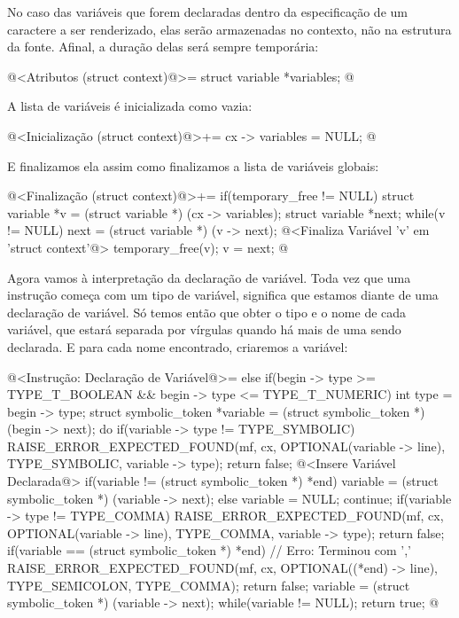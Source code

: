 No caso das variáveis que forem declaradas dentro da especificação de
um caractere a ser renderizado, elas serão armazenadas no contexto,
não na estrutura da fonte. Afinal, a duração delas será sempre
temporária:

\iniciocodigo
@<Atributos (struct context)@>=
  struct variable *variables;
@
\fimcodigo

A lista de variáveis é inicializada como vazia:

\iniciocodigo
@<Inicialização (struct context)@>+=
cx -> variables = NULL;
@
\fimcodigo

E finalizamos ela assim como finalizamos a lista de variáveis globais:

\iniciocodigo
@<Finalização (struct context)@>+=
if(temporary_free != NULL){
  struct variable *v = (struct variable *) (cx -> variables);
  struct variable *next;
  while(v != NULL){
    next = (struct variable *) (v -> next);
    @<Finaliza Variável 'v' em 'struct context'@>
    temporary_free(v);
    v = next;
  }
}
@
\fimcodigo

Agora vamos à interpretação da declaração de variável. Toda vez que
uma instrução começa com um tipo de variável, significa que estamos
diante de uma declaração de variável. Só temos então que obter o tipo
e o nome de cada variável, que estará separada por vírgulas quando há
mais de uma sendo declarada. E para cada nome encontrado, criaremos a
variável:

\iniciocodigo
@<Instrução: Declaração de Variável@>=
else if(begin -> type >= TYPE_T_BOOLEAN && begin -> type <= TYPE_T_NUMERIC){
  int type = begin -> type;
  struct symbolic_token *variable = (struct symbolic_token *) (begin -> next);
  do{
    if(variable -> type != TYPE_SYMBOLIC){
      RAISE_ERROR_EXPECTED_FOUND(mf, cx, OPTIONAL(variable -> line),
                                 TYPE_SYMBOLIC, variable -> type);
      return false;
    }
    @<Insere Variável Declarada@>
    if(variable != (struct symbolic_token *) *end)
      variable = (struct symbolic_token *) (variable -> next);
    else{
      variable = NULL;
      continue;
    }
    if(variable -> type != TYPE_COMMA){
      RAISE_ERROR_EXPECTED_FOUND(mf, cx, OPTIONAL(variable -> line),
                                 TYPE_COMMA, variable -> type);
      return false;
    }
    if(variable == (struct symbolic_token *) *end){ // Erro: Terminou com ','
      RAISE_ERROR_EXPECTED_FOUND(mf, cx, OPTIONAL((*end) -> line),
                                TYPE_SEMICOLON, TYPE_COMMA);
      return false;
    }
    variable = (struct symbolic_token *) (variable -> next);
  } while(variable != NULL);
  return true;
}
@
\fimcodigo

